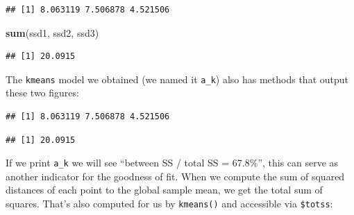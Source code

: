 \documentclass[]{article}
\newenvironment{Shaded}{\begin{snugshade}}{\end{snugshade}}
\newcommand{\DecValTok}[1]{\textcolor[rgb]{0.00,0.00,0.81}{#1}}
\newcommand{\KeywordTok}[1]{\textcolor[rgb]{0.13,0.29,0.53}{\textbf{#1}}}
\newcommand{\NormalTok}[1]{#1}
\newcommand{\OperatorTok}[1]{\textcolor[rgb]{0.81,0.36,0.00}{\textbf{#1}}}
\newcommand{\StringTok}[1]{\textcolor[rgb]{0.31,0.60,0.02}{#1}}
\begin{document}
\begin{verbatim}
## [1] 8.063119 7.506878 4.521506
\end{verbatim}

\begin{Shaded}
\begin{Highlighting}[]
\KeywordTok{sum}\NormalTok{(ssd1, ssd2, ssd3)}
\end{Highlighting}
\end{Shaded}

\begin{verbatim}
## [1] 20.0915
\end{verbatim}

The \texttt{kmeans} model we obtained (we named it \texttt{a\_k}) also
has methods that output these two figures:

\begin{Shaded}
\end{Shaded}

\begin{verbatim}
## [1] 8.063119 7.506878 4.521506
\end{verbatim}

\begin{Shaded}
\end{Shaded}

\begin{verbatim}
## [1] 20.0915
\end{verbatim}

If we print \texttt{a\_k} we will see ``between SS / total SS =
67.8\%'', this can serve as another indicator for the goodness of fit.
When we compute the sum of squared distances of each point to the global
sample mean, we get the total sum of squares. That's also computed for
us by \texttt{kmeans()} and accessible via \texttt{\$totss}:

\begin{Shaded}
\end{Shaded}
\end{document}
